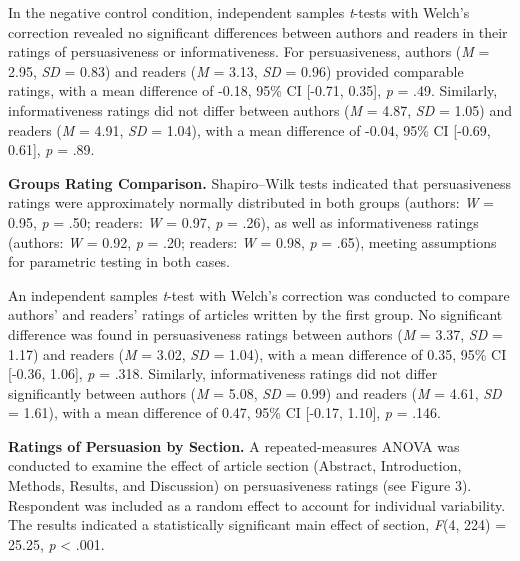 \documentclass[authordate, meta]{jote-new-article}
\begin{document}
	In the negative control condition, independent samples \emph{t}-tests with Welch's correction revealed no significant differences between authors and readers in their ratings of persuasiveness or informativeness. For persuasiveness, authors (\emph{M} = 2.95, \emph{SD} = 0.83) and readers (\emph{M} = 3.13, \emph{SD} = 0.96) provided comparable ratings, with a mean difference of -0.18, 95\% CI [-0.71, 0.35], \emph{p} = .49. Similarly, informativeness ratings did not differ between authors (\emph{M} = 4.87, \emph{SD} = 1.05) and readers (\emph{M} = 4.91, \emph{SD} = 1.04), with a mean difference of -0.04, 95\% CI [-0.69, 0.61], \emph{p }= .89.



	\textbf{Groups Rating Comparison.} Shapiro--Wilk tests indicated that persuasiveness ratings were approximately normally distributed in both groups (authors: \emph{W} = 0.95, \emph{p} = .50; readers: \emph{W} = 0.97, \emph{p} = .26), as well as informativeness ratings (authors: \emph{W} = 0.92, \emph{p} = .20; readers: \emph{W} = 0.98, \emph{p} = .65), meeting assumptions for parametric testing in both cases.



	An independent samples \emph{t}-test with Welch's correction was conducted to compare authors' and readers' ratings of articles written by the first group. No significant difference was found in persuasiveness ratings between authors (\emph{M} = 3.37, \emph{SD} = 1.17) and readers (\emph{M} = 3.02, \emph{SD} = 1.04), with a mean difference of 0.35, 95\% CI [-0.36, 1.06], \emph{p }= .318. Similarly, informativeness ratings did not differ significantly between authors (\emph{M} = 5.08, \emph{SD} = 0.99) and readers (\emph{M} = 4.61, \emph{SD} = 1.61), with a mean difference of 0.47, 95\% CI [-0.17, 1.10], \emph{p} = .146.



	\textbf{Ratings of Persuasion by Section. }A repeated-measures ANOVA was conducted to examine the effect of article section (Abstract, Introduction, Methods, Results, and Discussion) on persuasiveness ratings (see Figure 3). Respondent was included as a random effect to account for individual variability. The results indicated a statistically significant main effect of section, \emph{F}(4, 224) = 25.25, \emph{p} < .001.






	
\end{document}
